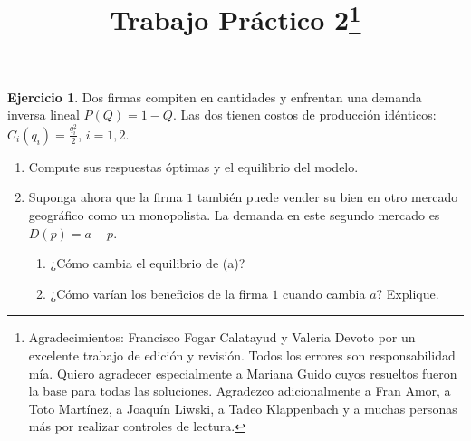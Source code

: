 \documentclass[a4paper, 11pt]{article}
\theoremstyle{definition}
\newtheorem{ejercicio}{Ejercicio}
\begin{document}
\title{Trabajo Práctico 2\footnote{Agradecimientos: Francisco Fogar Calatayud y Valeria Devoto por un excelente trabajo de edición y revisión. Todos los errores son responsabilidad mía. Quiero agradecer especialmente a Mariana Guido cuyos resueltos fueron la base para todas las soluciones. Agradezco adicionalmente a Fran Amor, a Toto Martínez, a Joaquín Liwski, a Tadeo Klappenbach y a muchas personas más por realizar controles de lectura.}} 
\author{}

\maketitle 


\begin{ejercicio} %

Dos firmas compiten en cantidades y enfrentan una demanda inversa lineal
$P(Q) = 1-Q$. Las dos tienen costos de producción idénticos: $C_i(q_i) = \frac{q_i^2}{2}$, $i = 1, 2$.

\begin{enumerate}[label=(\alph*)]
\item Compute sus respuestas óptimas y el equilibrio del modelo.
\item Suponga ahora que la firma $1$ también puede vender su bien en otro mercado geográfico como un monopolista. La demanda en este segundo mercado es $D(p) = a-p$.
\begin{enumerate}[label=\roman*.]
\item ¿Cómo cambia el equilibrio de (a)?
\item ¿Cómo varían los beneficios de la firma $1$ cuando cambia $a$? Explique.
\end{enumerate}
\end{enumerate}
\end{ejercicio}
\end{document}

